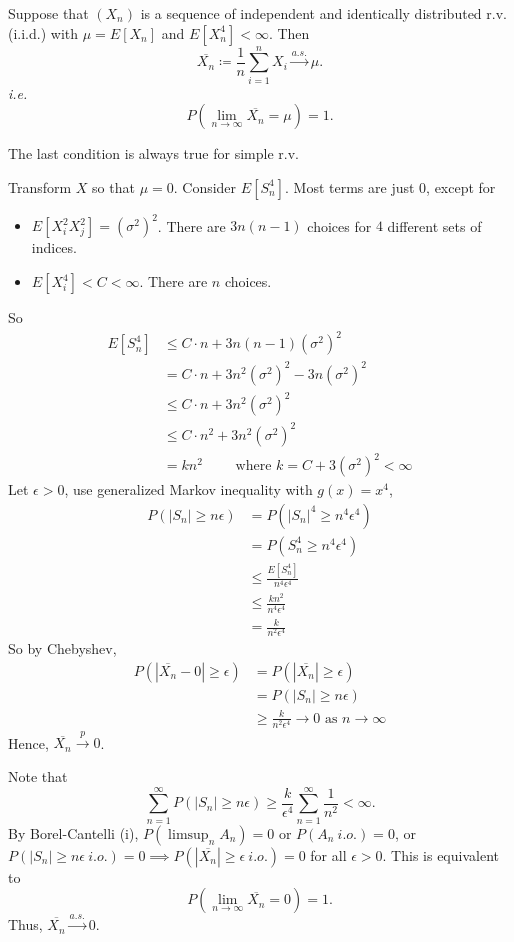 \documentclass[class=article,crop=false]{standalone}
\begin{document}
\begin{thm}
	Suppose that $ (X_n)$ is a sequence of independent and identically distributed r.v. (i.i.d.) with $ \mu = E[X_n]$ and $ E[X_n^{4}]< \infty$. Then
	\[
	\overline{X_n} \coloneqq \frac{1}{n} \sum_{ i= 1}^{ n} X_i \xrightarrow{ a.s.} \mu 
	.\] 
	\emph{i.e.} 
	\[
		P\left(\lim_{ n \to \infty} \overline{X_n}=\mu \right)=1
	.\] 
\end{thm}
\begin{note}[]
The last condition is always true for simple r.v.
\end{note}


\begin{prf}
	Transform $ X$ so that $ \mu=0$. Consider $ E[S_n^{4}]$. Most terms are just 0, except for
	\begin{itemize}
		\item $ E[X_i^2 X_j^2] = ( \sigma^2)^2$. There are $ 3n(n-1)$ choices for $ 4$ different sets of indices. 
		\item $ E[X_i^4] < C < \infty$. There are $ n$ choices.
	\end{itemize}
	So
	\begin{align*}	
		E[S_n^{4}] &\leq C \cdot  n + 3n(n-1)( \sigma^2)^2\\
			  &= C \cdot  n + 3n^2( \sigma^2)^2 - 3n ( \sigma^2)^2 \\
			  &\leq C \cdot n + 3n^2( \sigma^2)^2\\
			  &\leq C \cdot n^2 + 3n^2 ( \sigma^2)^2\\
			  &=kn^2 \qquad \text{ where } k=C + 3( \sigma^2)^2 < \infty
	\end{align*}
	Let $ \epsilon>0$, use generalized Markov inequality with $ g(x) = x^{4}$,
	\begin{align*}
		P(|S_n|\geq n \epsilon) &= P(|S_n|^{4} \geq n^{4} \epsilon^{4})\\
					&= P(S_n^{4}\geq n^{4} \epsilon^{4}) \\
					&\leq \frac{E[S_n^{4}]}{n^{4} \epsilon^{4} }\\
					&\leq \frac{kn^2}{n^{4} \epsilon^{4} }\\
					&= \frac{k}{n^2 \epsilon^{4}}
	\end{align*}
	So by Chebyshev, 
	\begin{align*}
		P(| \overline{X_n} - 0| \geq \epsilon) &= P(|\overline{X_n}| \geq \epsilon) \\
						       &= P(|S_n|\geq n \epsilon) \\
						       &\geq \frac{k}{n^2 \epsilon^{4}} \to 0 \text{ as } n \to \infty 
	\end{align*}
	Hence, $ \overline{X_n} \xrightarrow{ p} 0 $.

Note that
\[
	\sum_{ n= 1}^{\infty} P(|S_n|\geq n \epsilon) \geq \frac{k}{ \epsilon^{4}} \sum_{ n= 1}^{\infty} \frac{1}{n^2} < \infty
.\] 
By Borel-Cantelli (i), $ P(\limsup_{  n} A_n)=0$ or $ P(A_n\ i.o.)=0$, or $ P(|S_n|\geq n \epsilon \ i.o.) =0 \implies P(|\overline{X_n}| \geq \epsilon \ i.o.)=0$ for all $ \epsilon>0$. This is equivalent to
\[
	P(\lim_{ n \to \infty} \overline{X_n}=0) =1
.\] 
Thus, $ \overline{X_n} \xrightarrow{ a.s.} 0 $.

\end{prf}
\end{document}
